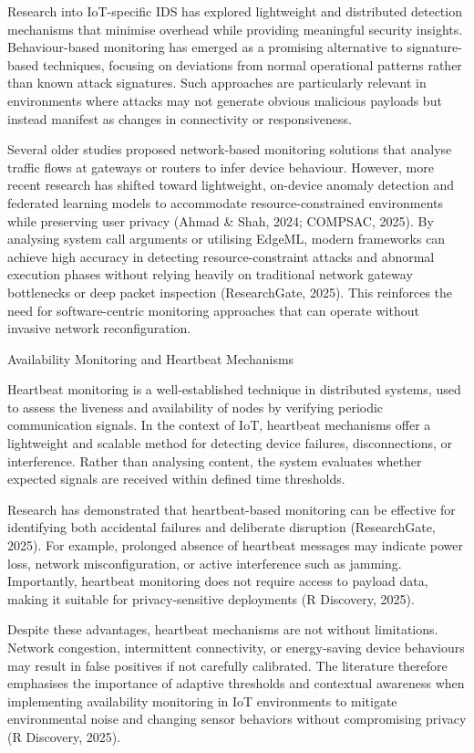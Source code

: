 Research into IoT-specific IDS has explored lightweight and distributed detection mechanisms that minimise overhead while providing meaningful security insights. Behaviour-based monitoring has emerged as a promising alternative to signature-based techniques, focusing on deviations from normal operational patterns rather than known attack signatures. Such approaches are particularly relevant in environments where attacks may not generate obvious malicious payloads but instead manifest as changes in connectivity or responsiveness.

Several older studies proposed network-based monitoring solutions that analyse traffic flows at gateways or routers to infer device behaviour. However, more recent research has shifted toward lightweight, on-device anomaly detection and federated learning models to accommodate resource-constrained environments while preserving user privacy (Ahmad \& Shah, 2024; COMPSAC, 2025). By analysing system call arguments or utilising EdgeML, modern frameworks can achieve high accuracy in detecting resource-constraint attacks and abnormal execution phases without relying heavily on traditional network gateway bottlenecks or deep packet inspection (ResearchGate, 2025). This reinforces the need for software-centric monitoring approaches that can operate without invasive network reconfiguration.

Availability Monitoring and Heartbeat Mechanisms

Heartbeat monitoring is a well-established technique in distributed systems, used to assess the liveness and availability of nodes by verifying periodic communication signals. In the context of IoT, heartbeat mechanisms offer a lightweight and scalable method for detecting device failures, disconnections, or interference. Rather than analysing content, the system evaluates whether expected signals are received within defined time thresholds.

Research has demonstrated that heartbeat-based monitoring can be effective for identifying both accidental failures and deliberate disruption (ResearchGate, 2025). For example, prolonged absence of heartbeat messages may indicate power loss, network misconfiguration, or active interference such as jamming. Importantly, heartbeat monitoring does not require access to payload data, making it suitable for privacy-sensitive deployments (R Discovery, 2025).

Despite these advantages, heartbeat mechanisms are not without limitations. Network congestion, intermittent connectivity, or energy-saving device behaviours may result in false positives if not carefully calibrated. The literature therefore emphasises the importance of adaptive thresholds and contextual awareness when implementing availability monitoring in IoT environments to mitigate environmental noise and changing sensor behaviors without compromising privacy (R Discovery, 2025).

